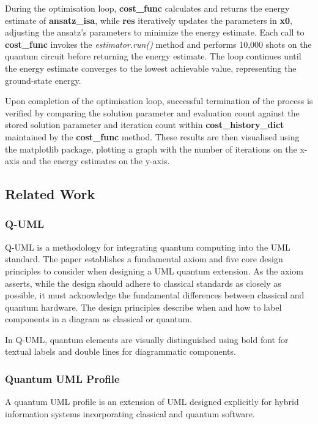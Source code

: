 \documentclass{article}
\begin{document}
{During the optimisation loop, \textbf{cost\_func} calculates and returns the energy estimate of \textbf{ansatz\_isa}, while \textbf{res} iteratively updates the parameters in \textbf{x0}, adjusting the ansatz's parameters to minimize the energy estimate. Each call to \textbf{cost\_func} invokes the \textit{estimator.run()} method and performs 10,000 shots on the quantum circuit before returning the energy estimate. The loop continues until the energy estimate converges to the lowest achievable value, representing the ground-state energy.

Upon completion of the optimisation loop, successful termination of the process is verified by comparing the solution parameter and evaluation count against the stored solution parameter and iteration count within \textbf{cost\_history\_dict} maintained by the \textbf{cost\_func} method. These results are then visualised using the matplotlib package, plotting a graph with the number of iterations on the x-axis and the energy estimates on the y-axis.

\subsection{Related Work}

\subsubsection{Q-UML}

Q-UML is a methodology for integrating quantum computing into the UML standard. The paper establishes a fundamental axiom and five core design principles to consider when designing a UML quantum extension. As the axiom asserts, while the design should adhere to classical standards as closely as possible, it must acknowledge the fundamental differences between classical and quantum hardware. The design principles describe when and how to label components in a diagram as classical or quantum.

In Q-UML, quantum elements are visually distinguished using bold font for textual labels and double lines for diagrammatic components. 

\subsubsection{Quantum UML Profile}

A quantum UML profile is an extension of UML designed explicitly for hybrid information systems incorporating classical and quantum software.

}
\end{document}
